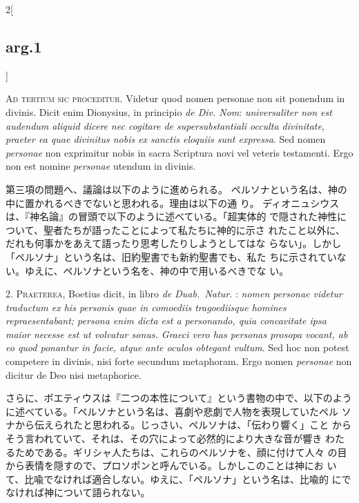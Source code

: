 \documentclass[paper=a4paper,fontsize=10pt,jafontsize=9pt,titlepage]{jlreq}
\begin{document}
\begin{paracol}{2}[\subsection{arg.1}]

{\Huge A}{\scshape d tertium sic proceditur}. Videtur quod nomen personae non sit ponendum
in divinis. Dicit enim Dionysius, in principio {\itshape de
Div. Nom}: {\itshape universaliter non est audendum aliquid dicere nec cogitare de
supersubstantiali occulta divinitate, praeter ea quae divinitus nobis ex
sanctis eloquiis sunt expressa}. Sed nomen {\itshape personae} non exprimitur nobis
in sacra Scriptura novi vel veteris testamenti. Ergo non est nomine
{\itshape personae} utendum in divinis.

\switchcolumn

第三項の問題へ、議論は以下のように進められる。
ペルソナという名は、神の中に置かれるべきでないと思われる。理由は以下の通
 り。
ディオニュシウスは、『神名論』の冒頭で以下のように述べている。「超実体的
 で隠された神性について、聖者たちが語ったことによって私たちに神的に示さ
 れたこと以外に、だれも何事かをあえて語ったり思考したりしようとしてはな
 らない」。しかし「ペルソナ」という名は、旧約聖書でも新約聖書でも、私た
 ちに示されていない。ゆえに、ペルソナという名を、神の中で用いるべきでな
 い。


2. {\scshape Praeterea}, Boetius dicit, in libro {\itshape de
 Duab.~Natur.} : {\itshape nomen personae
videtur traductum ex his personis quae in comoediis tragoediisque
homines repraesentabant; persona enim dicta est a personando, quia
concavitate ipsa maior necesse est ut volvatur sonus. Graeci vero has
personas prosopa vocant, ab eo quod ponantur in facie, atque ante oculos
obtegant vultum}. Sed hoc non potest competere in divinis, nisi forte
secundum metaphoram. Ergo nomen {\itshape personae} non dicitur de Deo
 nisi metaphorice.

\switchcolumn

さらに、ボエティウスは『二つの本性について』という書物の中で、以下のよう
 に述べている。「ペルソナという名は、喜劇や悲劇で人物を表現していたペル
 ソナから伝えられたと思われる。じっさい、ペルソナは、「伝わり響く」こと
 からそう言われていて、それは、その穴によって必然的により大きな音が響き
 わたるためである。ギリシャ人たちは、これらのペルソナを、顔に付けて人々
 の目から表情を隠すので、プロソポンと呼んでいる。しかしこのことは神にお
 いて、比喩でなければ適合しない。ゆえに、「ペルソナ」という名は、比喩的
 にでなければ神について語られない。


\end{paracol}
\end{document}
